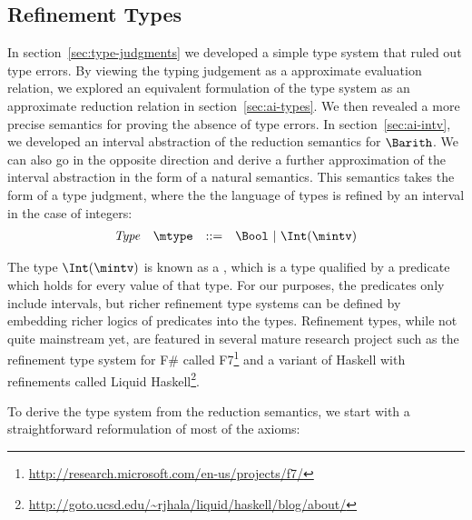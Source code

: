 \subsection{Refinement Types}

In section~\ref{sec:type-judgments} we developed a simple type system
that ruled out type errors.  By viewing the typing judgement as a
approximate evaluation relation, we explored an equivalent formulation
of the type system as an approximate reduction relation in
section~\ref{sec:ai-types}.  We then revealed a more precise semantics
for proving the absence of type errors.  In section~\ref{sec:ai-intv},
we developed an interval abstraction of the reduction semantics for
$\Barith$.  We can also go in the opposite direction and derive a
further approximation of the interval abstraction in the form of a
natural semantics.  This semantics takes the form of a type judgment,
where the the language of types is refined by an interval in the case
of integers:
\[
\begin{array}{llcl}
\mathit{Type}  & \mtype & ::= & \Bool\ |\ \Int(\mintv)
\end{array}
\]

The type $\Int(\mintv)$ is known as a , which
is a type qualified by a predicate which holds for every value of that
type.  For our purposes, the predicates only include intervals, but
richer refinement type systems can be defined by embedding richer
logics of predicates into the types.  Refinement types, while not
quite mainstream yet, are featured in several mature research project
such as the refinement type system for F\# called
F7\footnote{\url{http://research.microsoft.com/en-us/projects/f7/}}
and a variant of Haskell with refinements called Liquid
Haskell\footnote{\url{http://goto.ucsd.edu/~rjhala/liquid/haskell/blog/about/}}.

To derive the type system from the reduction semantics, we start with
a straightforward reformulation of most of the axioms:

